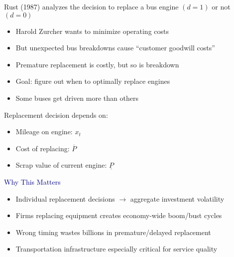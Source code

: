 \documentclass[aspectratio=169]{beamer}
\begin{document}
\begin{frame}

Rust (1987) analyzes the decision to replace a bus engine $(d=1)$ or not $(d=0)$

\bigskip{}


\begin{itemize}
\itemsep1.5em
\item<3-> Harold Zurcher wants to minimize operating costs
\item<4-> But unexpected bus breakdowns cause ``customer goodwill costs''
\item<5-> Premature replacement is costly, but so is breakdown
\item<6-> Goal: figure out when to optimally replace engines
\item<7-> Some buses get driven more than others
\end{itemize}

\end{frame}

\begin{frame}
Replacement decision depends on:
\bigskip{}

\begin{itemize}
\itemsep1.5em
\item Mileage on engine: $x_t$
\item Cost of replacing: $\overline{P}$
\item Scrap value of current engine: $\underline{P}$
\end{itemize}

\bigskip{}



\end{frame}



\begin{frame}

\textcolor{navy}{Why This Matters}

\bigskip{}

\begin{itemize}
\itemsep1.5em
\item<1-> Individual replacement decisions $\rightarrow$ aggregate investment volatility
\item<2-> Firms replacing equipment creates economy-wide boom/bust cycles
\item<3-> Wrong timing wastes billions in premature/delayed replacement
\item<4-> Transportation infrastructure especially critical for service quality
\end{itemize}

\end{frame}
\end{document}
